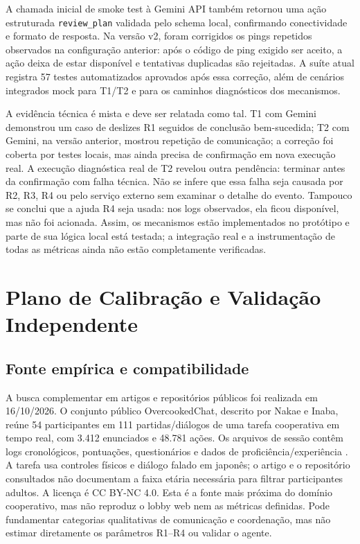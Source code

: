 \documentclass[conference]{IEEEtran}
\begin{document}
A chamada inicial de smoke test à Gemini API também retornou uma ação estruturada \texttt{review\_plan} validada pelo schema local, confirmando conectividade e formato de resposta. Na versão v2, foram corrigidos os pings repetidos observados na configuração anterior: após o código de ping exigido ser aceito, a ação deixa de estar disponível e tentativas duplicadas são rejeitadas. A suíte atual registra 57 testes automatizados aprovados após essa correção, além de cenários integrados mock para T1/T2 e para os caminhos diagnósticos dos mecanismos.

A evidência técnica é mista e deve ser relatada como tal. T1 com Gemini demonstrou um caso de deslizes R1 seguidos de conclusão bem-sucedida; T2 com Gemini, na versão anterior, mostrou repetição de comunicação; a correção foi coberta por testes locais, mas ainda precisa de confirmação em nova execução real. A execução diagnóstica real de T2 revelou outra pendência: terminar antes da confirmação com falha técnica. Não se infere que essa falha seja causada por R2, R3, R4 ou pelo serviço externo sem examinar o detalhe do evento. Tampouco se conclui que a ajuda R4 seja usada: nos logs observados, ela ficou disponível, mas não foi acionada. Assim, os mecanismos estão implementados no protótipo e parte de sua lógica local está testada; a integração real e a instrumentação de todas as métricas ainda não estão completamente verificadas.

\section{Plano de Calibração e Validação Independente}

\subsection{Fonte empírica e compatibilidade}

A busca complementar em artigos e repositórios públicos foi realizada em 16/10/2026. O conjunto público OvercookedChat, descrito por Nakae e Inaba, reúne 54 participantes em 111 partidas/diálogos de uma tarefa cooperativa em tempo real, com 3.412 enunciados e 48.781 ações. Os arquivos de sessão contêm logs cronológicos, pontuações, questionários e dados de proficiência/experiência \cite{nakae2025,overcooked_repo}. A tarefa usa controles físicos e diálogo falado em japonês; o artigo e o repositório consultados não documentam a faixa etária necessária para filtrar participantes adultos. A licença é CC BY-NC 4.0. Esta é a fonte mais próxima do domínio cooperativo, mas não reproduz o lobby web nem as métricas definidas. Pode fundamentar categorias qualitativas de comunicação e coordenação, mas não estimar diretamente os parâmetros R1--R4 ou validar o agente.
\end{document}
